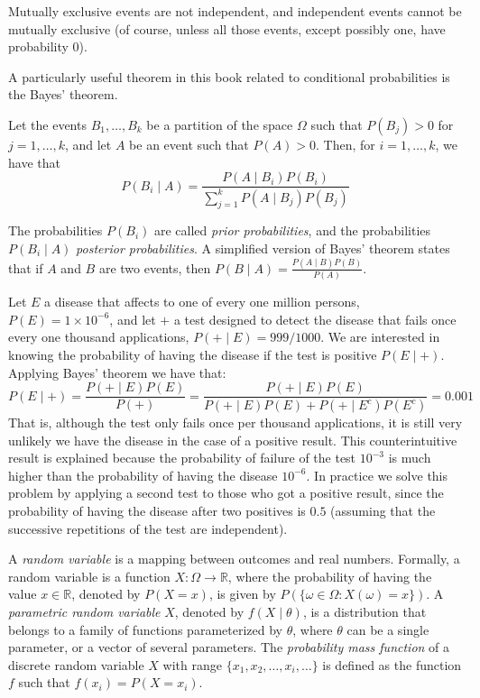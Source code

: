 \begin{example}
Mutually exclusive events are not independent, and independent events cannot be mutually exclusive (of course, unless all those events, except possibly one, have probability 0).
\end{example}

A particularly useful theorem in this book related to conditional probabilities is the Bayes' theorem.

\begin{theorem}
\label{th:bayes}
Let the events $B_1, \ldots, B_k$ be a partition of the space $\Omega$ such that $P(B_j) > 0$ for $j = 1, \ldots, k$, and let $A$ be an event such that $P(A) > 0$. Then, for $i = 1, \ldots, k$, we have that
\[
P(B_i \mid A) = \frac{P(A \mid B_i) P(B_i)}{\sum_{j=1}^{k} P(A \mid B_j) P(B_j)}
\]
\end{theorem}

The probabilities $P(B_i)$ are called \emph{prior probabilities}, and the probabilities $P(B_i \mid A)$ \emph{posterior probabilities}. A simplified version of Bayes' theorem states that if $A$ and $B$ are two events, then $P(B \mid A) = \frac{P(A \mid B) P(B)}{P(A)}$.

\begin{example}
Let $E$ a disease that affects to one of every one million persons, $P(E) = 1 \times 10^{-6}$, and let $+$ a test designed to detect the disease that fails once every one thousand applications, $P(+ \mid E) = 999/1000$. We are interested in knowing the probability of having the disease if the test is positive $P(E \mid +)$. Applying Bayes' theorem we have that:
\[
P(E \mid +) = \frac{P(+ \mid E) P(E)}{P(+)} = \frac{P(+ \mid E) P(E)}{P(+ \mid E) P(E) + P(+ \mid E^c) P(E^c)} = 0.001
\]
That is, although the test only fails once per thousand applications, it is still very unlikely we have the disease in the case of a positive result. This counterintuitive result is explained because the probability of failure of the test $10^{-3}$ is much higher than the probability of having the disease $10^{-6}$. In practice we solve this problem by applying a second test to those who got a positive result, since the probability of having the disease after two positives is $0.5$ (assuming that the successive repetitions of the test are independent).
\end{example}

A \emph{random variable} is a mapping between outcomes and real numbers. Formally, a random variable is a function $X : \Omega \rightarrow \mathbb{R}$, where the probability of having the value $x \in \mathbb{R}$, denoted by $P(X=x)$, is given by $P(\{ \omega \in \Omega : X(\omega) = x\})$. A \emph{parametric random variable} $X$, denoted by $f\left(X \mid \theta \right)$, is a distribution that belongs to a family of functions parameterized by $\theta$, where $\theta$ can be a single parameter, or a vector of several parameters. The \emph{probability mass function} of a discrete random variable $X$ with range $\{ x_1, x_2, \ldots, x_i, \ldots \}$ is defined as the function $f$ such that $f(x_i) = P(X=x_i)$.

